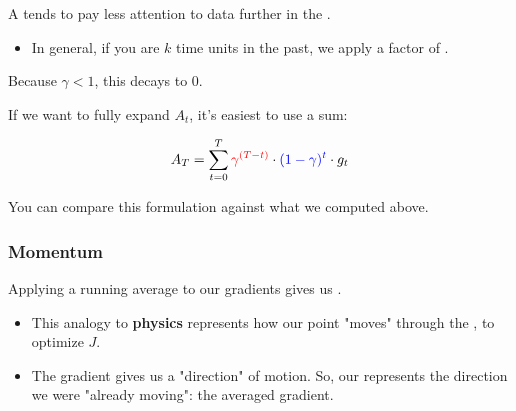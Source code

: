             \begin{concept}
                A  tends to pay less attention to data further in the .

                \begin{itemize}
                    \item In general, if you are $k$ time units in the past, we apply a factor of .
                \end{itemize}

                Because $\gamma<1$, this  decays to 0.

                \subsecdiv

                If we want to fully expand $A_t$, it's easiest to use a sum:

                \begin{equation*}
                    A_T = \sum_{t=0}^T \textcolor{red}{\gamma^{(T-t)}} \cdot \textcolor{blue}{(1-\gamma)^t} \cdot g_t
                \end{equation*}
            \end{concept}
            You can compare this formulation against what we computed above.

            \subsecdiv
            
        \subsubsection{Momentum}

            Applying a running average to our gradients gives us .

            \begin{itemize}
                \item This analogy to \textbf{physics} represents how our point "moves" through the , to optimize $J$.
                    
                \item The gradient gives us a "direction" of motion. So, our  represents the direction we were "already moving": the  averaged gradient.
            \end{itemize}

